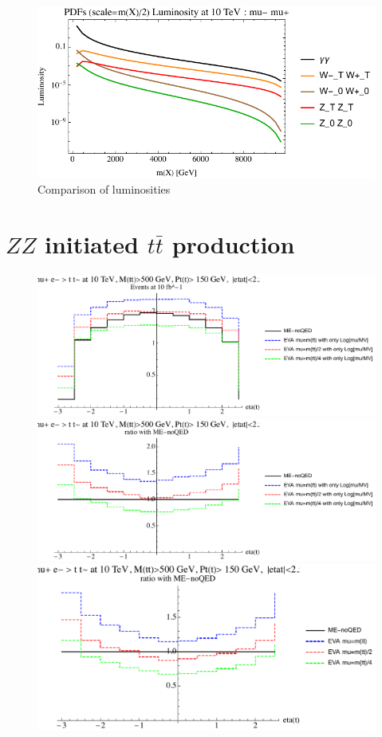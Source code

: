 \documentclass[a4paper,11pt]{article}
\begin{document}
\begin{figure}
\includegraphics[width=0.9\linewidth]{Notebooks/PlotLumi/10TeV/lumis/plotgammaWZ.pdf} 
\caption{Comparison of luminosities \label{fig:lumicomparison}}
\end{figure}

 
\clearpage

\section{$ZZ$ initiated $t \bar t$ production}

\begin{figure}[ht]
\includegraphics[width=0.46\linewidth]{Notebooks/PlotDistr/ZZ_tt/10TeVcuts/plotetat.pdf}
\includegraphics[width=0.46\linewidth]{Notebooks/PlotDistr/ZZ_tt/10TeVcuts/plotetatratio1.pdf}
\includegraphics[width=0.46\linewidth]{Notebooks/PlotDistr/ZZ_tt/10TeVcuts/plotetatratio2.pdf}
\end{figure}
\end{document}
